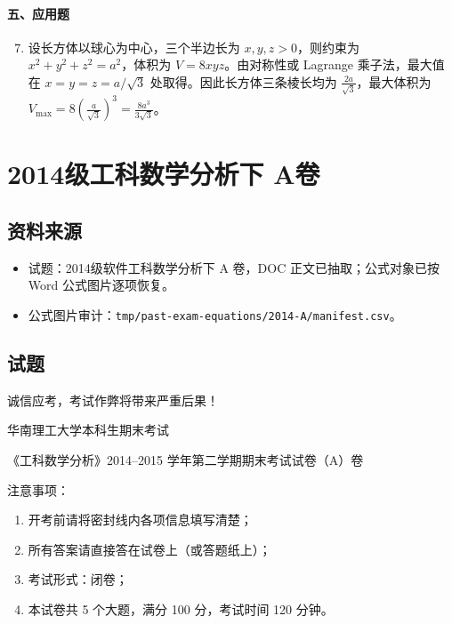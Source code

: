 \paragraph*{五、应用题}
\begin{enumerate}
  \setcounter{enumi}{6}
  \item 设长方体以球心为中心，三个半边长为 \(x,y,z>0\)，则约束为 \(\displaystyle x^2+y^2+z^2=a^2\)，体积为 \(V=8xyz\)。由对称性或 Lagrange 乘子法，最大值在 \(x=y=z=a/\sqrt3\) 处取得。因此长方体三条棱长均为 \(\displaystyle \frac{2a}{\sqrt3}\)，最大体积为 \(\displaystyle V_{\max}=8\left(\frac{a}{\sqrt3}\right)^3=\frac{8a^3}{3\sqrt3}\)。
\end{enumerate}

\section{2014级工科数学分析下 A卷}

\subsection{资料来源}
\begin{itemize}
  \item 试题：2014级软件工科数学分析下 A 卷，DOC 正文已抽取；公式对象已按 Word 公式图片逐项恢复。
  \item 公式图片审计：\texttt{tmp/past-exam-equations/2014-A/manifest.csv}。
\end{itemize}

\subsection{试题}
诚信应考，考试作弊将带来严重后果！

华南理工大学本科生期末考试

《工科数学分析》2014--2015 学年第二学期期末考试试卷（A）卷

注意事项：
\begin{enumerate}
  \item 开考前请将密封线内各项信息填写清楚；
  \item 所有答案请直接答在试卷上（或答题纸上）；
  \item 考试形式：闭卷；
  \item 本试卷共 5 个大题，满分 100 分，考试时间 120 分钟。
\end{enumerate}

